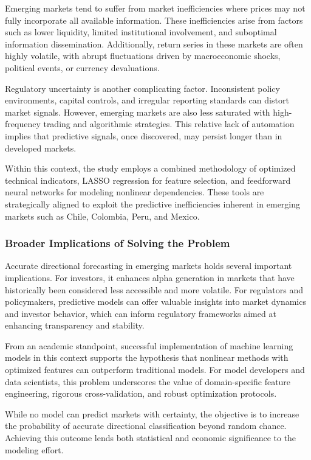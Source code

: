 Emerging markets tend to suffer from market inefficiencies where prices may not fully incorporate all available information. These inefficiencies arise from factors such as lower liquidity, limited institutional involvement, and suboptimal information dissemination. Additionally, return series in these markets are often highly volatile, with abrupt fluctuations driven by macroeconomic shocks, political events, or currency devaluations.

Regulatory uncertainty is another complicating factor. Inconsistent policy environments, capital controls, and irregular reporting standards can distort market signals. However, emerging markets are also less saturated with high-frequency trading and algorithmic strategies. This relative lack of automation implies that predictive signals, once discovered, may persist longer than in developed markets.

Within this context, the study employs a combined methodology of optimized technical indicators, LASSO regression for feature selection, and feedforward neural networks for modeling nonlinear dependencies. These tools are strategically aligned to exploit the predictive inefficiencies inherent in emerging markets such as Chile, Colombia, Peru, and Mexico.

\subsubsection{Broader Implications of Solving the Problem}

Accurate directional forecasting in emerging markets holds several important implications. For investors, it enhances alpha generation in markets that have historically been considered less accessible and more volatile. For regulators and policymakers, predictive models can offer valuable insights into market dynamics and investor behavior, which can inform regulatory frameworks aimed at enhancing transparency and stability.

From an academic standpoint, successful implementation of machine learning models in this context supports the hypothesis that nonlinear methods with optimized features can outperform traditional models. For model developers and data scientists, this problem underscores the value of domain-specific feature engineering, rigorous cross-validation, and robust optimization protocols.

While no model can predict markets with certainty, the objective is to increase the probability of accurate directional classification beyond random chance. Achieving this outcome lends both statistical and economic significance to the modeling effort.

